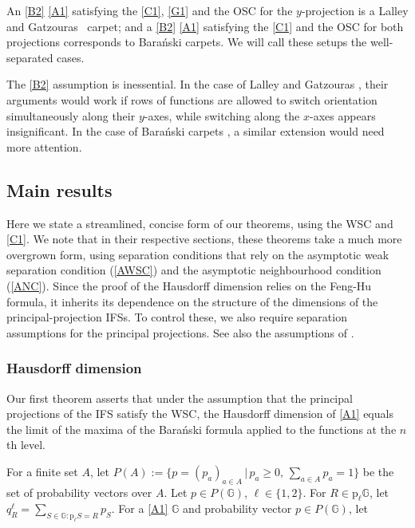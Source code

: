 \documentclass[a4paper, 11pt]{article}
\numberwithin{equation}{section}
\theoremstyle{plain}
\theoremstyle{remark}
\theoremstyle{definition}
\begin{document}
An \ref{B2} \ref{A1} satisfying the \ref{C1}, \ref{G1} and the OSC for the $y$-projection is a Lalley and Gatzouras~\cite{MR1183358} carpet; and a \ref{B2} \ref{A1} satisfying the \ref{C1} and the OSC for both projections corresponds to Bara\'nski \cite{MR2298824} carpets. We will call these setups the well-separated cases.

The \ref{B2} assumption is inessential. In the case of Lalley and Gatzouras \cite{MR1183358}, their arguments would work if rows of functions are allowed to switch orientation simultaneously along their $y$-axes, while switching along the $x$-axes appears insignificant. In the case of Bara\'nski carpets \cite{MR2298824}, a similar extension would need more attention.

\subsection{Main results}

Here we state a streamlined, concise form of our theorems, using the WSC and \ref{C1}. We note that in their respective sections, these theorems take a much more overgrown form, using separation conditions that rely on the asymptotic weak separation condition (\ref{AWSC}) and the asymptotic neighbourhood condition (\ref{ANC}). Since the proof of the Hausdorff dimension relies on the Feng-Hu formula, it inherits its dependence on the structure of the dimensions of the principal-projection IFSs. To control these, we also require separation assumptions for the principal projections. See also the assumptions of \cite[Theorem 1.3]{rapaport2023dimensiondiagonalselfaffinesets}. 


\subsubsection{Hausdorff dimension}
Our first theorem asserts that under the assumption that the principal projections of the IFS satisfy the WSC, the Hausdorff dimension of \ref{A1} equals the limit of the maxima of the Bara\'nski formula applied to the functions at the $n$th level. 

For a finite set $A$, let $P(A):=\{p=(p_a)_{a\in A}\, \big|\, p_a\ge 0,\, \sum_{a\in A}p_a=1 \}$ be the set of probability vectors over $A$. Let $p \in P(\mathbb{G})$, $\ell \in \{1,2\}$. For $R\in\mathrm{p}_\ell\mathbb{G}$, let $q_{R}^\ell=\sum_{S\in\mathbb{G}: \mathrm{p}_\ell S=R}p_S$. For a \ref{A1} $\mathbb{G}$ and probability vector $p \in P(\mathbb{G})$, let
\end{document}
